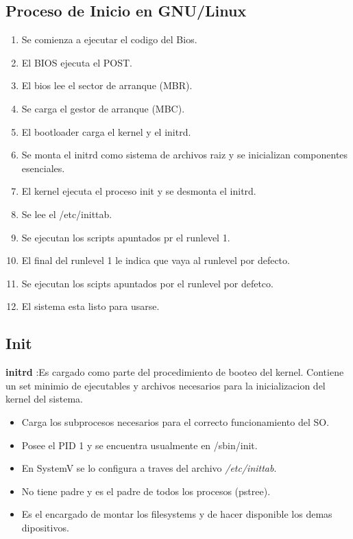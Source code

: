\documentclass[11pt]{article}
\begin{document}
\subsection{Proceso de Inicio en GNU/Linux}
\begin{enumerate}
    \item Se comienza a ejecutar el codigo del Bios.
    \item El BIOS ejecuta el POST.
    \item El bios lee el sector de arranque (MBR).
    \item Se carga el gestor de arranque (MBC).
    \item El bootloader carga el kernel y el initrd.
    \item Se monta el initrd como sistema de archivos raiz y se inicializan componentes esenciales.
    \item El kernel ejecuta el proceso init y se desmonta el initrd.
    \item Se lee el /etc/inittab.
    \item Se ejecutan los scripts apuntados pr el runlevel 1.
    \item El final del runlevel 1 le indica que vaya al runlevel por defecto.
    \item Se ejecutan los scipts apuntados por el runlevel por defetco.
    \item El sistema esta listo para usarse.
\end{enumerate}

\subsection{Init}
\textbf{initrd} :Es cargado como parte del procedimiento de booteo del kernel. Contiene un set minimio de ejecutables y archivos necesarios para la inicializacion del kernel del sistema.
\begin{itemize}
    \item Carga los subprocesos necesarios para el correcto funcionamiento del SO.
    \item Posee el PID 1 y se encuentra usualmente en /sbin/init.
    \item En SystemV se lo configura a traves del archivo \textit{/etc/inittab}.
    \item No tiene padre y es el padre de todos los procesos (pstree).
    \item Es el encargado de montar los filesystems y de hacer disponible los demas dipositivos.
\end{itemize}
\end{document}
